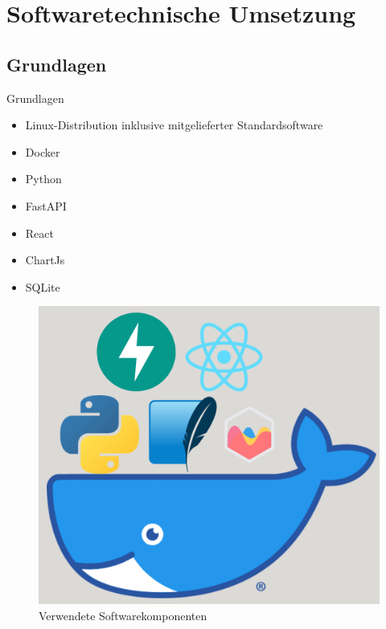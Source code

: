 \documentclass[10pt,ngerman]{beamer}
\begin{document}
\section{Softwaretechnische Umsetzung}

\subsection{Grundlagen}
\begin{frame}[fragile]{Grundlagen}
  \begin{minipage}[t]{0.49\textwidth}
    \begin{itemize}
      \item Linux-Distribution inklusive mitgelieferter Standardsoftware
      \item Docker
      \item Python
      \item FastAPI
      \item React
      \item ChartJs
      \item SQLite
    \end{itemize}
  \end{minipage}
  \begin{minipage}[t]{0.49\textwidth}
    \begin{figure}
      \centering
      \captionsetup{justification=centering}
      \includegraphics[width=1\textwidth]{pictures/SoftwareKomponenten.png}
      \caption{Verwendete Softwarekomponenten}
    \end{figure}
  \end{minipage}
\end{frame}
\end{document}
